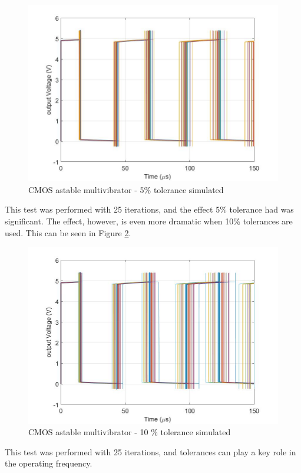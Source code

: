 \begin{figure}[H]
    \centering
        \centering
        \includegraphics[scale = .35]{CircuitDevelopment/cd4007SIM/astable_5_tolerance.jpg}
        \caption{CMOS astable multivibrator - 5\% tolerance simulated}
        \label{fig:astable5percent}
\end{figure} 
This test was performed with 25 iterations, and the effect 5\% tolerance had was significant. The effect, however, is even more dramatic when 10\% tolerances are used. This can be seen in Figure \ref{fig:astable10percent}.

\begin{figure}[H]
    \centering
        \centering
        \includegraphics[scale = .35]{CircuitDevelopment/cd4007SIM/astable_10_tolerance.jpg}
        \caption{CMOS astable multivibrator  - 10 \% tolerance simulated}
        \label{fig:astable10percent}
\end{figure} 
This test was performed with 25 iterations, and tolerances can play a key role in the operating frequency.



